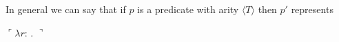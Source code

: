 \begin{shaded}
In general we can say that if $p$ is a predicate with arity $\langle
T\rangle$ then $p'$ represents \nexteg{} %
\begin{ex} 
 
  $\ulcorner\lambda
  r$: . $\urcorner$ 
 
 
   
\end{ex} 
  
\end{shaded}


